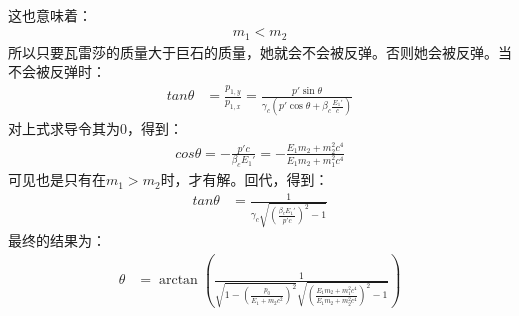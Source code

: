 \begin{enumerate}
\begin{align*}
	\end{align*}
	这也意味着：
	\begin{align*}
		m_1 < m_2
	\end{align*}
	所以只要瓦雷莎的质量大于巨石的质量，她就会不会被反弹。否则她会被反弹。当不会被反弹时：
	\begin{align*}
		tan\theta &= \frac{p_{1,y}}{p_{1,x}} = \frac{p' \sin \theta}{\gamma_c ( p' \cos \theta + \beta_c \frac{E_{1}'}{c})} 
	\end{align*}
	对上式求导令其为0，得到：
	\begin{align*}
		cos\theta = -\frac{p' c}{\beta_c E_1'} = -\frac{E_1 m_2 + m_2^2 c^4}{E_1 m_2+ m_1^2 c^4}
	\end{align*}
	可见也是只有在\(m_1 > m_2\)时，才有解。回代，得到：
	\begin{align*}
		tan\theta &= \frac{1}{\gamma_c \sqrt{(\frac{\beta_c E_1'}{p' c})^2-1}} 
	\end{align*}
	最终的结果为：
	\begin{align*}
		\theta &= \arctan \left(\frac{1}{\sqrt{1-(\frac{p_0}{E_1 + m_2c^2})^2}\sqrt{(\frac{E_1 m_2 + m_1^2 c^4}{E_1 m_2+ m_2^2 c^4})^2-1}} \right)
	\end{align*}

\end{enumerate}